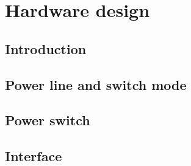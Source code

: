 \chapter{Hardware design}
\section{Introduction}
%

\section{Power line and switch mode}
%

\section{Power switch}
%

\section{Interface}
%
